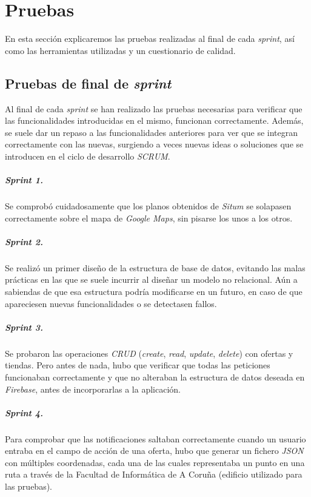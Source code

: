 \chapter{Pruebas}
En esta sección explicaremos las pruebas realizadas al final de cada \textit{sprint}, así como las herramientas utilizadas y un cuestionario de calidad.

\section{Pruebas de final de \textit{sprint}}
Al final de cada \textit{sprint} se han realizado las pruebas necesarias para verificar que las funcionalidades introducidas en el mismo, funcionan correctamente. Además, se suele dar un repaso a las funcionalidades anteriores para ver que se integran correctamente con las nuevas, surgiendo a veces nuevas ideas o soluciones que se introducen en el ciclo de desarrollo \textit{SCRUM}.

\paragraph{\textit{Sprint} 1.} Se comprobó cuidadosamente que los planos obtenidos de \textit{Situm} se solapasen correctamente sobre el mapa de \textit{Google Maps}, sin pisarse los unos a los otros.

\paragraph{\textit{Sprint} 2.} Se realizó un primer diseño de la estructura de base de datos, evitando las malas prácticas en las que se suele incurrir al diseñar un modelo no relacional. Aún a sabiendas de que esa estructura podría modificarse en un futuro, en caso de que apareciesen nuevas funcionalidades o se detectasen fallos.

\paragraph{\textit{Sprint} 3.} Se probaron las operaciones \textit{CRUD} (\textit{create}, \textit{read}, \textit{update}, \textit{delete}) con ofertas y tiendas. Pero antes de nada, hubo que verificar que todas las peticiones funcionaban correctamente y que no alteraban la estructura de datos deseada en \textit{Firebase}, antes de incorporarlas a la aplicación.

\paragraph{\textit{Sprint} 4.} Para comprobar que las notificaciones saltaban correctamente cuando un usuario entraba en el campo de acción de una oferta, hubo que generar un fichero \textit{JSON} con múltiples coordenadas, cada una de las cuales representaba un punto en una ruta a través de la Facultad de Informática de A Coruña (edificio utilizado para las pruebas).

